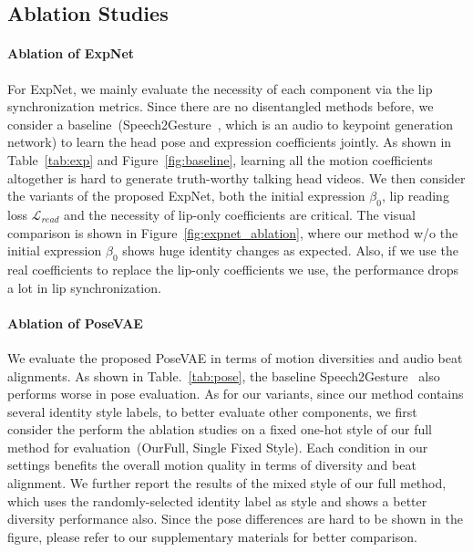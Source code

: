 

\subsection{Ablation Studies}
\label{ablation}






\paragraph{Ablation of ExpNet} For ExpNet, we mainly evaluate the necessity  of each component via the lip synchronization metrics. Since there are no disentangled methods before, we consider a baseline~(Speech2Gesture~\cite{speech2gesture}, which is an audio to keypoint generation network) to learn the head pose and expression coefficients jointly. As shown in Table~\ref{tab:exp} and Figure~\ref{fig:baseline}, learning all the motion coefficients altogether is hard to generate truth-worthy talking head videos. We then consider the variants of the proposed ExpNet, both the initial expression $\beta_0$, lip reading loss $\mathcal{L}_{read}$ and the necessity of lip-only coefficients are critical. The visual comparison is shown in Figure~\ref{fig:expnet_ablation}, where our method w/o the initial expression $\beta_0$ shows huge identity changes as expected. 
Also, if we use the real coefficients to replace the lip-only coefficients we use, the performance drops a lot in lip synchronization.





\paragraph{Ablation of PoseVAE}



% 

We evaluate the proposed PoseVAE in terms of motion diversities and audio beat alignments. As shown in Table.~\ref{tab:pose}, the baseline Speech2Gesture~\cite{speech2gesture} also performs worse in pose evaluation. As for our variants, 
since our method contains several identity style labels, to better evaluate other components, we first consider the perform the ablation studies on a fixed one-hot style of our full method for evaluation~(OurFull, Single Fixed Style). 
Each condition in our settings benefits the overall motion quality in terms of diversity and beat alignment. We further report the results of the mixed style of our full method, which uses the randomly-selected identity label as style and shows a better diversity performance also. Since the pose differences are hard to be shown in the figure, please refer to our supplementary materials for better comparison.

